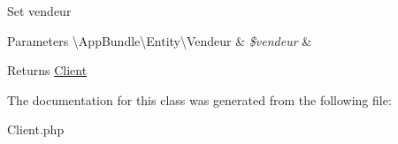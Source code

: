 Set vendeur


\begin{DoxyParams}[1]{Parameters}
\textbackslash{}\+App\+Bundle\textbackslash{}\+Entity\textbackslash{}\+Vendeur & {\em \$vendeur} & \\
\hline
\end{DoxyParams}
\begin{DoxyReturn}{Returns}
\hyperlink{class_app_bundle_1_1_entity_1_1_client}{Client} 
\end{DoxyReturn}


The documentation for this class was generated from the following file\+:\begin{DoxyCompactItemize}
\item 
Client.\+php\end{DoxyCompactItemize}
